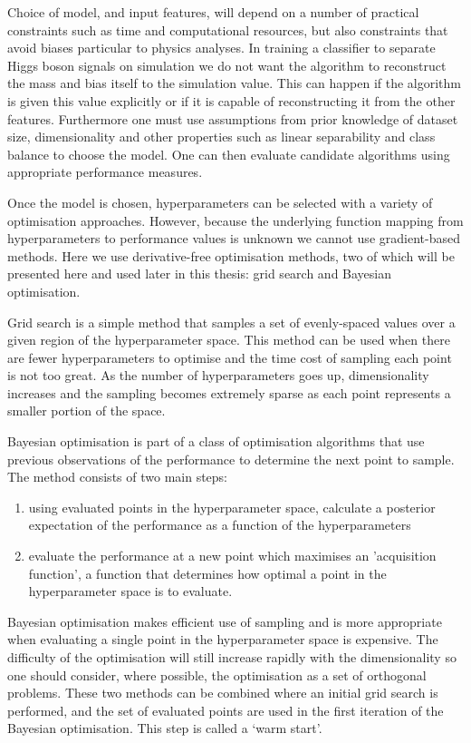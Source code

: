 Choice of model, and input features, will depend on a number of practical constraints such as time and computational resources, but also constraints that avoid biases particular to physics analyses. 
In training a classifier to separate Higgs boson signals on simulation we do not want the algorithm to reconstruct the mass and bias itself to the simulation value. This can happen if the algorithm is given this value explicitly or if it is capable of reconstructing it from the other features.  
Furthermore one must use assumptions from prior knowledge of dataset size, dimensionality and other properties such as linear separability and class balance to choose the model. One can then evaluate candidate algorithms using appropriate performance measures. 


Once the model is chosen, hyperparameters can be selected with a variety of optimisation approaches. However, because the underlying function mapping from hyperparameters to performance values is unknown we cannot use gradient-based methods. Here we use derivative-free optimisation methods, two of which will be presented here and used later in this thesis: grid search and Bayesian optimisation.

Grid search is a simple method that samples a set of evenly-spaced values over a given region of the hyperparameter space. 
This method can be used when there are fewer hyperparameters to optimise and the time cost of sampling each point is not too great. 
As the number of hyperparameters goes up, dimensionality increases and the sampling becomes extremely sparse as each point represents a smaller portion of the space.

Bayesian optimisation \cite{BayesOpt} is part of a class of optimisation algorithms that use previous observations of the performance to determine the next point to sample. 
The method consists of two main steps:
\begin{enumerate}[leftmargin=.5in,noitemsep]
    \item using evaluated points in the hyperparameter space, calculate a posterior expectation of the performance as a function of the hyperparameters
    \item evaluate the performance at a new point which maximises an 'acquisition function', a function that determines how optimal a point in the hyperparameter space is to evaluate. 
\end{enumerate}
Bayesian optimisation makes efficient use of sampling and is more appropriate when evaluating a single point in the hyperparameter space is expensive. The difficulty of the optimisation will still increase rapidly with the dimensionality so one should consider, where possible, the optimisation as a set of orthogonal problems.  
These two methods can be combined where an initial grid search is performed, and the set of evaluated points are used in the first iteration of the Bayesian optimisation. 
This step is called a `warm start'. 

